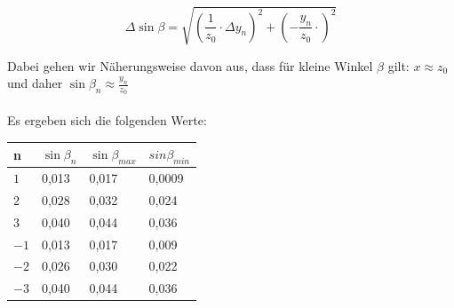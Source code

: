\documentclass[12pt,a4paper,titlepage,headinclude,bibtotoc]{scrartcl}
\begin{document}
\begin{equation}
\Delta \sin \beta = \sqrt{ \left( \dfrac{1}{z_0} \cdot \Delta y_n \right)^2 + \left(- \dfrac{y_n}{z_0} \cdot \right)^2 } 
\end{equation}

Dabei gehen wir Näherungsweise davon aus, dass für kleine Winkel $\beta$ gilt: $x \approx z_0$ und daher $\sin \beta_n \approx \frac{y_n}{z_0}$\\\\

\newpage
Es ergeben sich die folgenden Werte: \\


\begin{table} [h]
\centering
\begin{tabular}{|p{2 cm}||p{3 cm}|p{3 cm}|p{3 cm}|}
		\hline
         n & $\sin\beta_n$  & $\sin\beta_{max} $ & $sin\beta_{min}$ \\
         \hline 
         $1 $& 0,013& 0,017 & 0,0009 \\
         \hline
         $2 $& 0,028&  0,032 &0,024 \\
         \hline
         $3 $& 0,040& 0,044& 0,036\\
         \hline
         $-1$& 0,013&  0,017& 0,009 \\
         \hline
         $-2$& 0,026& 0,030 & 0,022 \\
         \hline             
         $-3$& 0,040& 0,044  & 0,036 \\
         \hline
\end{tabular}
\end{table}
\end{document}

